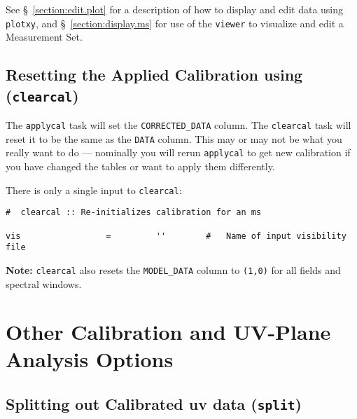 See \S~\ref{section:edit.plot} for a description of how to display and edit 
data using {\tt plotxy}, and \S~\ref{section:display.ms} for use of
the {\tt viewer} to visualize and edit a Measurement Set.

\subsection{Resetting the Applied Calibration using ({\tt clearcal})}
\label{section:cal.correct.clearcal}

The {\tt applycal} task will set the {\tt CORRECTED\_DATA} column.
The {\tt clearcal} task will reset it to be the same as
the {\tt DATA} column.  This may or may not be what you really
want to do --- nominally you will rerun {\tt applycal} to get
new calibration if you have changed the tables or want to apply them
differently.

There is only a single input to {\tt clearcal}:
\small
\begin{verbatim}
#  clearcal :: Re-initializes calibration for an ms

vis                 =         ''        #   Name of input visibility file

\end{verbatim}
\normalsize

{\bf Note:} {\tt clearcal} also resets the {\tt MODEL\_DATA} column
to {\tt (1,0)} for all fields and spectral windows.

\section{Other Calibration and UV-Plane Analysis Options}
\label{section:cal.other}

\subsection{Splitting out Calibrated uv data ({\tt split})}
\label{section:cal.other.split}

